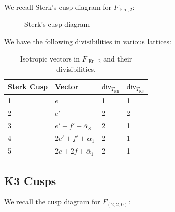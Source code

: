 \documentclass{amsart}
\begin{document}
\begin{remark}

We recall Sterk's cusp diagram for \(F_{\operatorname{En}, 2}\):

\begin{figure}[H]
\centering

\caption{Sterk's cusp diagram}
\label{fig:sterk-cusp-diagram}
\end{figure}

We have the following divisibilities in various lattices:

\begin{table}[]
\centering
\begin{tabular}{llll}
\hline
Sterk Cusp & Vector                           & $\mathrm{div}_{T_{\operatorname{En}}}$ & $\mathrm{div}_{T_{\mathrm{K3} } }$ \\ \hline
1          & $e$                              & 1                      & 1                                  \\
2          & $e'$                             & 2                      & 2                                  \\
3          & $e' + f' + \overline{\alpha}_8$  & 2                      & 1                                  \\
4          & $2e' + f' + \overline{\alpha}_1$ & 2                      & 1                                  \\
5          & $2e + 2f + \overline{\alpha}_1$  & 2                      & 1                                  \\ \hline
\end{tabular}
\caption{Isotropic vectors in $F_{\operatorname{En}, 2}$ and their divisibilities.}
\label{tab:sterk-cusp-divisibilities}
\end{table}

\end{remark}

\subsection{K3 Cusps}\label{k3-cusps}

\begin{remark}

We recall the cusp diagram for \(F_{(2,2,0)}\):

\begin{figure}[H]
\centering

\caption{}
\label{fig:220-cusp-diagram}
\end{figure}

\end{remark}
\end{document}
